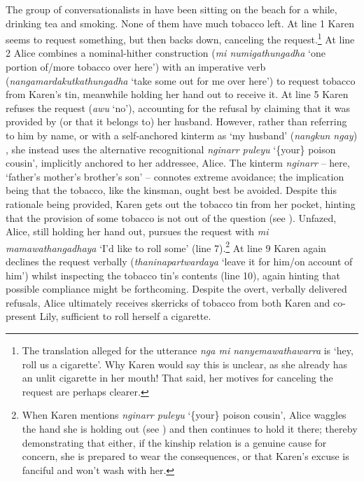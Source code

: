 \documentclass[output=paper,nonflat,colorlinks,citecolor=brown]{langsci/langscibook}
\begin{document}
The group of conversationalists in  have been sitting on the beach for a while, drinking tea and smoking. None of them have much tobacco left. At line 1 Karen seems to request something, but then backs down, canceling the request.\footnote{The translation alleged for the utterance \textit{nga mi nanyemawathawarra} is ‘hey, roll us a cigarette’. Why Karen would say this is unclear, as she already has an unlit cigarette in her mouth! That said, her motives for canceling the request are perhaps clearer.} At line 2 Alice combines a nominal-hither construction (\textit{mi numigathungadha} ‘one portion of/more tobacco over here’) with an imperative verb (\textit{nangamardakutkathungadha} ‘take some out for me over here’) to request tobacco from Karen’s tin, meanwhile holding her hand out to receive it. At line 5 Karen refuses the request (\textit{awu} ‘no’), accounting for the refusal by claiming that it was provided by (or that it belongs to) her husband. However, rather than referring to him by name, or with a self-anchored kinterm as ‘my husband’ (\textit{nangkun ngay}) \citep{Blythe2010b}, she instead uses the alternative recognitional \citep{Stivers2007} \textit{nginarr puleyu} ‘\{your\} poison cousin’, implicitly anchored to her addressee, Alice. The kinterm \textit{nginarr} -- here, ‘father’s mother’s brother’s son’ -- connotes extreme avoidance; the implication being that the tobacco, like the kinsman, ought best be avoided. Despite this rationale being provided, Karen gets out the tobacco tin from her pocket, hinting that the provision of some tobacco is not out of the question (see ).  Unfazed, Alice, still holding her hand out, pursues the request with \textit{mi mamawathangadhaya} ‘I’d like to roll some’ (line 7).\footnote{When Karen mentions \textit{nginarr puleyu} ‘\{your\} poison cousin’, Alice waggles the hand she is holding out (see ) and then continues to hold it there; thereby demonstrating that either, if the kinship relation is a genuine cause for concern, she is prepared to wear the consequences, or that Karen’s excuse is fanciful and won’t wash with her.} At line 9 Karen again declines the request verbally (\textit{thaninapartwardaya} ‘leave it for him/on account of him’) whilst inspecting the tobacco tin’s contents (line 10), again hinting that possible compliance might be forthcoming. Despite the overt, verbally delivered refusals, Alice ultimately receives skerricks of tobacco from both Karen and co-present Lily, sufficient to roll herself a cigarette.
\end{document}
